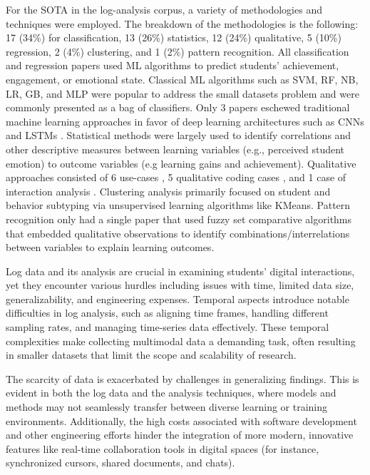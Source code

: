 \documentclass[manuscript,screen,review]{acmart}
\begin{document}
For the SOTA in the log-analysis corpus, a variety of methodologies and techniques were employed. The breakdown of the methodologies is the following: 17 (34\%) for classification, 13 (26\%) statistics, 12 (24\%) qualitative, 5 (10\%) regression, 2 (4\%) clustering, and 1 (2\%) pattern recognition. All classification and regression papers used ML algorithms to predict students' achievement, engagement, or emotional state. Classical ML algorithms such as SVM, RF, NB, LR, GB, and MLP \cite{147203129, 483140962, 1019093033%
} were popular to address the small datasets problem and were commonly presented as a bag of classifiers. Only 3 papers eschewed traditional machine learning approaches in favor of deep learning architectures such as CNNs \cite{1637690235} and LSTMs \cite{2070224207, 3051560548}. Statistical methods were largely used to identify correlations and other descriptive measures between learning variables (e.g., perceived student emotion) to outcome variables (e.g learning gains and achievement). Qualitative approaches consisted of 6 use-cases \cite{666050348, 818492192, 1296637108}, 5 qualitative coding cases \cite{2273914836, 2936220551, 3856280479}, and 1 case of interaction analysis \cite{2273914836}. Clustering analysis primarily focused on student and behavior subtyping \cite{2273914836,818492192} via unsupervised learning algorithms like KMeans. Pattern recognition only had a single paper \cite{123412197} that used fuzzy set comparative algorithms that embedded qualitative observations to identify combinations/interrelations between variables to explain learning outcomes.

Log data and its analysis are crucial in examining students' digital interactions, yet they encounter various hurdles including issues with time, limited data size, generalizability, and engineering expenses. Temporal aspects introduce notable difficulties in log analysis, such as aligning time frames, handling different sampling rates, and managing time-series data effectively. These temporal complexities make collecting multimodal data a demanding task, often resulting in smaller datasets that limit the scope and scalability of research.

The scarcity of data is exacerbated by challenges in generalizing findings. This is evident in both the log data and the analysis techniques, where models and methods may not seamlessly transfer between diverse learning or training environments. Additionally, the high costs associated with software development and other engineering efforts hinder the integration of more modern, innovative features like real-time collaboration tools in digital spaces (for instance, synchronized cursors, shared documents, and chats).
\end{document}
